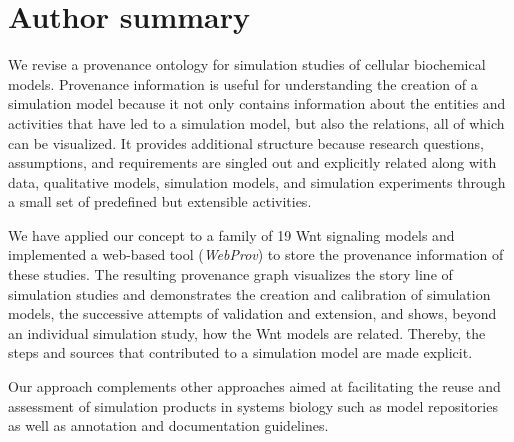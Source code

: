 \documentclass[10pt,letterpaper]{article}
\newcommand{\webprov}{\textit{WebProv}}
\newcommand{\wnt}{Wnt}
\begin{document}



\section*{Author summary}

We revise a provenance ontology for simulation studies of cellular biochemical models.
Provenance information is useful for understanding the creation of a simulation model because it not only contains information about the entities and activities that have led to a simulation model, but also the relations, all of which can be visualized.
It provides additional structure because research questions, assumptions, and requirements are singled out and explicitly related along with data, qualitative models, simulation models, and simulation experiments through a small set of predefined but extensible activities.

We have applied our concept to a family of 19 \wnt{} signaling models and implemented a web-based tool (\webprov{}) to store the provenance information of these studies.
The resulting provenance graph visualizes the story line of simulation studies and demonstrates the creation and calibration of simulation models, the successive attempts of validation and extension, and shows, beyond an individual simulation study, how the \wnt{} models are related.
Thereby, the steps and sources that contributed to a simulation model are made explicit.

Our approach complements other approaches aimed at facilitating the reuse and assessment of simulation products in systems biology such as model repositories as well as annotation and documentation guidelines.



\linenumbers

\end{document}
